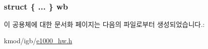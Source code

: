 \subsubsection[{\texorpdfstring{wb}{wb}}]{\setlength{\rightskip}{0pt plus 5cm}struct \{ ... \}   wb}\hypertarget{unione1000__rx__desc__packet__split_aee790866b06c5ef60bc024f62e69dd9d}{}\label{unione1000__rx__desc__packet__split_aee790866b06c5ef60bc024f62e69dd9d}


이 공용체에 대한 문서화 페이지는 다음의 파일로부터 생성되었습니다.\+:\begin{DoxyCompactItemize}
\item 
kmod/igb/\hyperlink{kmod_2igb_2e1000__hw_8h}{e1000\+\_\+hw.\+h}\end{DoxyCompactItemize}

